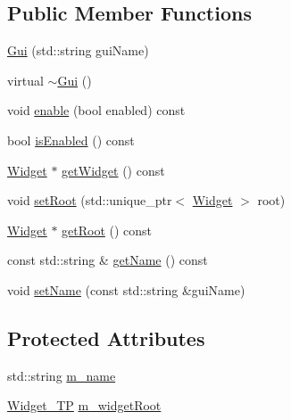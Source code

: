 \subsection*{Public Member Functions}
\begin{DoxyCompactItemize}
\item 
\mbox{\hyperlink{classec__gui_1_1_gui_a3db88342b9e6979451a50d96e769b10d}{Gui}} (std\+::string gui\+Name)
\item 
virtual \mbox{\hyperlink{classec__gui_1_1_gui_a77aa635b86319deb6318c1255ffddc7d}{$\sim$\+Gui}} ()
\item 
void \mbox{\hyperlink{classec__gui_1_1_gui_a173a82ceeec4a539c8e8fa840e73d867}{enable}} (bool enabled) const
\item 
bool \mbox{\hyperlink{classec__gui_1_1_gui_a1afd78c6ec1dc802c58adf5eb73fbf2e}{is\+Enabled}} () const
\item 
\mbox{\hyperlink{classec__gui_1_1_widget}{Widget}} $\ast$ \mbox{\hyperlink{classec__gui_1_1_gui_a35320910e22b37df873993786dde35e2}{get\+Widget}} () const
\item 
void \mbox{\hyperlink{classec__gui_1_1_gui_a85e0f5a75c0721cd6d83fa0531ebaa4d}{set\+Root}} (std\+::unique\+\_\+ptr$<$ \mbox{\hyperlink{classec__gui_1_1_widget}{Widget}} $>$ root)
\item 
\mbox{\hyperlink{classec__gui_1_1_widget}{Widget}} $\ast$ \mbox{\hyperlink{classec__gui_1_1_gui_a180e748ae4ff3db1398c2a2db7eee9f7}{get\+Root}} () const
\item 
const std\+::string \& \mbox{\hyperlink{classec__gui_1_1_gui_a9b55e3b7f9c46982e5c67fc84d909dd9}{get\+Name}} () const
\item 
void \mbox{\hyperlink{classec__gui_1_1_gui_a3d5ebcd1961f7f2b352ab071061e1c3f}{set\+Name}} (const std\+::string \&gui\+Name)
\end{DoxyCompactItemize}
\subsection*{Protected Attributes}
\begin{DoxyCompactItemize}
\item 
std\+::string \mbox{\hyperlink{classec__gui_1_1_gui_a2d2b9975b1375f9bb0d799877d8fc76a}{m\+\_\+name}}
\item 
\mbox{\hyperlink{classec__gui_1_1_gui_af2df87aa1795fe5b141e1137084f7822}{Widget\+\_\+\+TP}} \mbox{\hyperlink{classec__gui_1_1_gui_afc73c5c8b07c8ee9eb01ce84b5d0d748}{m\+\_\+widget\+Root}}
\end{DoxyCompactItemize}


